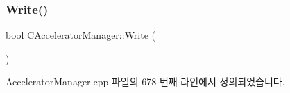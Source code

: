 \mbox{\label{class_c_accelerator_manager_a6ddd05a54ab0e66bc6ca8a7af3742e61}} 
\subsubsection{\texorpdfstring{Write()}{Write()}}
{\footnotesize\ttfamily bool C\+Accelerator\+Manager\+::\+Write (\begin{DoxyParamCaption}{ }\end{DoxyParamCaption})}



Accelerator\+Manager.\+cpp 파일의 678 번째 라인에서 정의되었습니다.


